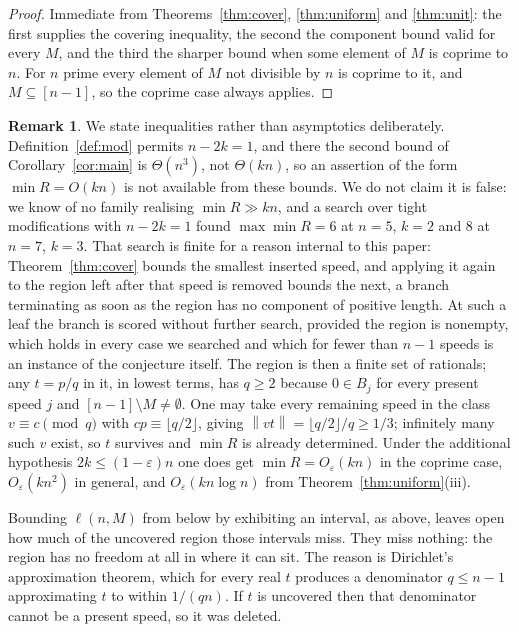 \documentclass[11pt]{amsart}
\theoremstyle{plain}
\theoremstyle{definition}
\newtheorem{remark}[theorem]{Remark}
\newcommand{\nrm}[1]{\left\lVert #1 \right\rVert}
\begin{document}
\begin{proof}
Immediate from Theorems~\ref{thm:cover}, \ref{thm:uniform} and \ref{thm:unit}: the first supplies
the covering inequality, the second the component bound valid for every $M$, and the third the
sharper bound when some element of $M$ is coprime to $n$. For $n$ prime every element of $M$ not
divisible by $n$ is coprime to it, and $M\subseteq[n-1]$, so the coprime case always applies.
\end{proof}

\begin{remark}\label{rem:notO}
We state inequalities rather than asymptotics deliberately. Definition~\ref{def:mod} permits
$n-2k=1$, and there the second bound of Corollary~\ref{cor:main} is $\Theta(n^{3})$, not
$\Theta(kn)$, so an assertion of the form $\min R=O(kn)$ is not available from these bounds. We do
not claim it is false: we know of no family realising $\min R\gg kn$, and a search over tight
modifications with $n-2k=1$ found $\max\min R=6$ at $n=5$, $k=2$ and $8$ at $n=7$, $k=3$. That search
is finite for a reason internal to this paper: Theorem~\ref{thm:cover} bounds the smallest inserted
speed, and applying it again to the region left after that speed is removed bounds the next, a branch
terminating as soon as the region has no component of positive length. At such a leaf the branch is
scored without further search, provided the region is nonempty, which holds in every case we
searched and which for fewer than $n-1$ speeds is an instance of the conjecture itself. The region is
then a finite set of rationals; any $t=p/q$ in it, in lowest terms, has $q\ge2$ because
$0\in B_j$ for every present speed $j$ and $[n-1]\setminus M\ne\emptyset$. One may take every remaining speed in the class
$v\equiv c\pmod q$ with $cp\equiv\lfloor q/2\rfloor$, giving $\nrm{vt}=\lfloor q/2\rfloor/q\ge1/3$;
infinitely many such $v$ exist, so $t$ survives and $\min R$ is already determined. Under the additional
hypothesis $2k\le(1-\varepsilon)n$ one does get $\min R=O_\varepsilon(kn)$ in the coprime case,
$O_\varepsilon(kn^{2})$ in general, and $O_\varepsilon(kn\log n)$ from
Theorem~\ref{thm:uniform}(iii).
\end{remark}

Bounding $\ell(n,M)$ from below by exhibiting an interval, as above, leaves open how much of the
uncovered region those intervals miss. They miss nothing: the region has no freedom at all in where
it can sit. The reason is Dirichlet's approximation theorem, which for every real $t$ produces a
denominator $q\le n-1$ approximating $t$ to within $1/(qn)$. If $t$ is uncovered then that
denominator cannot be a present speed, so it was deleted.
\end{document}
